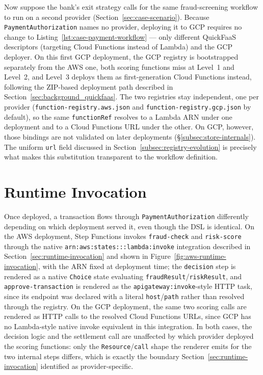 Now suppose the bank's exit strategy calls for the same fraud-screening workflow to run on a
second provider (Section~\ref{sec:case-scenario}). Because
\texttt{PaymentAuthorization} names no provider, deploying it to GCP requires no change to
Listing~\ref{lst:case-payment-workflow} --- only different QuickFaaS descriptors (targeting Cloud
Functions instead of Lambda) and the GCP deployer. On this first GCP deployment, the GCP registry is
bootstrapped separately from the AWS one, both scoring functions miss at Level~1 and Level~2, and
Level~3 deploys them as first-generation Cloud Functions instead, following the ZIP-based
deployment path described in Section~\ref{sec:background_quickfaas}. The two registries stay
independent, one per provider (\texttt{function-registry.aws.json} and
\texttt{function-registry.gcp.json} by default), so the same \texttt{functionRef} resolves to a
Lambda ARN under one deployment and to a Cloud Functions URL under the other. On GCP, however, those
bindings are not validated on later deployments (\S\ref{subsec:store-internals}). The uniform
\texttt{url} field discussed in
Section~\ref{subsec:registry-evolution} is precisely what makes this substitution transparent to
the workflow definition.

\section{Runtime Invocation}
\label{sec:case-runtime}

Once deployed, a transaction flows through \texttt{PaymentAuthorization} differently depending on
which deployment served it, even though the DSL is identical. On the AWS deployment, Step
Functions invokes \texttt{fraud-check} and \texttt{risk-score} through the native
\texttt{arn:aws:states:::lambda:invoke} integration described in Section~\ref{sec:runtime-invocation}
and shown in Figure~\ref{fig:aws-runtime-invocation}, with the ARN fixed at deployment time; the
\texttt{decision} step is rendered as a native \texttt{Choice} state evaluating
\texttt{fraudResult}/\texttt{riskResult}, and \texttt{approve-transaction} is rendered as the
\texttt{apigateway:invoke}-style HTTP task, since its endpoint was declared with a literal
\texttt{host}/\texttt{path} rather than resolved through the registry. On the GCP deployment, the
same two scoring calls are rendered as HTTP calls to the resolved Cloud Functions URLs, since GCP has no
Lambda-style native invoke equivalent in this integration. In both cases, the decision logic and
the settlement call are unaffected by which provider deployed the scoring functions: only the
\texttt{Resource}/\texttt{call} shape the renderer emits for the two internal steps differs, which
is exactly the boundary Section~\ref{sec:runtime-invocation} identified as provider-specific.

